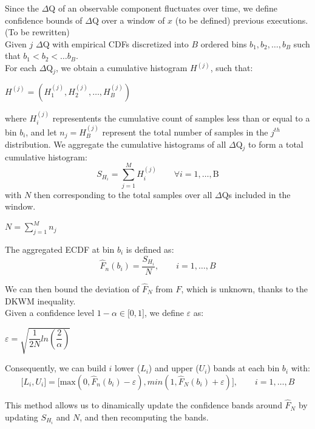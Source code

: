         Since the $\Delta$Q of an observable component fluctuates over time, we define confidence bounds of $\Delta$Q over a window of $x$ (to be defined) previous executions. (To be rewritten) \\

        Given $j$ $\Delta$Q with empirical CDFs discretized into $B$ ordered bins $b_1, b_2, \dots, b_B$ such that $b_1 < b_2 < \dots b_B$. \\
    For each $\Delta$Q$_j$, we obtain a cumulative histogram $H^{(j)}$, such that:
    \begin{center}
        $H^{(j)} = (H_1^{(j)}, H_2^{(j)}, \dots, H_B^{(j)})$
    \end{center}
    where $H_i^{(j)}$ representents the cumulative count of samples less than or equal to a bin $b_i$, and let $n_j = H_B^{(j)}$ represent the total number of samples in the $j^{th}$ distribution.
    We aggregate the cumulative histograms of all $\Delta$Q$_j$ to form a total cumulative histogram:
    \begin{equation}
        S_{H_i} = \sum_{j=1}^{M} H_i^{(j)} \qquad \forall i = 1, \dots, \text{B}
    \end{equation}
    with $N$ then corresponding to the total samples over all $\Delta$Qs included in the window.
    \begin{center}
    $N = \sum_{j=1}^{M} n_j$
    \end{center}

    The aggregated ECDF at bin $b_i$ is defined as:
    \begin{equation}
        \hat{F}_n(b_i) = \dfrac{S_{H_i}}{N}, \qquad i = 1, \dots, B
        \label{eq:}
    \end{equation}

    We can then bound the deviation of $\hat{F}_N$ from $F$, which is unknown, thanks to the DKWM inequality. \\
    Given a confidence level $1 - \alpha \in \lbrack 0, 1 \rbrack$, we define $\varepsilon$ as:
    \begin{center}
        $\varepsilon = \sqrt{\dfrac{1}{2N}ln(\dfrac{2}{\alpha})}$
    \end{center}

    Consequently, we can build $i$ lower ($L_i$) and upper ($U_i$) bands at each bin $b_i$ with:
    \begin{equation}
        \lbrack L_i, U_i \rbrack = \lbrack \text{max} (0, \hat{F}_n(b_i) - \varepsilon), min (1, \hat{F}_N(b_i) + \varepsilon) \rbrack, \qquad i = 1, \dots, B
        \label{eq:}
    \end{equation}

    This method allows us to dinamically update the confidence bands around $\hat{F}_N$ by updating $S_{H_i}$ and $N$, and then recomputing the bands.
